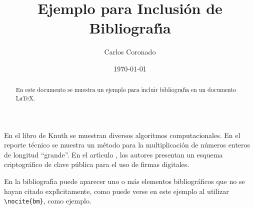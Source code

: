 \documentclass{article}            %
\author{Carlos Coronado}
\title{Ejemplo para Inclusi\'on de Bibliograf\'{\i}a}
\date{\today}
\begin{document}

\maketitle                         %

\begin{abstract}                   %

  En este documento se muestra un ejemplo para incluir
  bibliograf\'{\i}a en un documento \LaTeX.

\end{abstract}

En el libro de Knuth \cite{knuth} se muestran diversos algoritmos
computacionales.  En el reporte t\'ecnico \cite{zimmermann} se muestra
un m\'etodo para la multiplicaci\'on de n\'umeros enteros de longitud
``grande''.  En el art\'{\i}culo \cite{rsa}, los autores presentan un
esquema criptogr\'afico de clave p\'ublica para el uso de firmas digitales.
 
En la bibliograf\'{\i}a puede aparecer uno o m\'as elementos
bibliogr\'aficos que no se hayan citado expl\'{\i}citamente, como puede verse en este ejemplo al utilizar \verb|\nocite{bm}|, como ejemplo.

 \nocite{bm,hashmd5}

 
\end{document}
